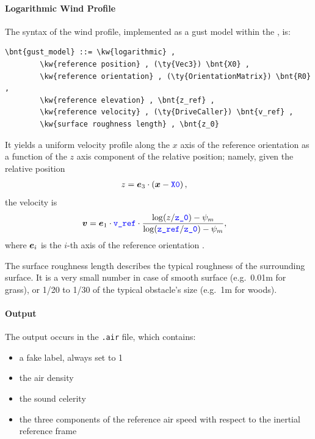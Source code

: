 \paragraph{Logarithmic Wind Profile}
The syntax of the  wind profile, implemented as a gust model
within the , is:
\begin{Verbatim}[commandchars=\\\{\}]
    \bnt{gust_model} ::= \kw{logarithmic} ,
        \kw{reference position} , (\ty{Vec3}) \bnt{X0} ,
        \kw{reference orientation} , (\ty{OrientationMatrix}) \bnt{R0} ,
        \kw{reference elevation} , \bnt{z_ref} ,
        \kw{reference velocity} , (\ty{DriveCaller}) \bnt{v_ref} ,
        \kw{surface roughness length} , \bnt{z_0}
\end{Verbatim}
It yields a uniform velocity profile along the $x$ axis of the
reference orientation as a function of the $z$ axis component
of the relative position; namely, given the relative position
\begin{align}
	z &= \boldsymbol{e}_3 \cdot \left( \boldsymbol{x} - \textcolor{blue}{\texttt{X0}} \right)
	,
\end{align}
the velocity is
\begin{align}
	\boldsymbol{v}
	&=
	\boldsymbol{e}_1 \cdot \textcolor{blue}{\texttt{v\_ref}} \cdot \frac{
		\log(z/\textcolor{blue}{\texttt{z\_0}}) - \psi_m
	}{
		\log(\textcolor{blue}{\texttt{z\_ref}}/\textcolor{blue}{\texttt{z\_0}}) - \psi_m
	}
	,
\end{align}
where $\boldsymbol{e}_i$ is the $i$-th axis of the reference orientation .

The surface roughness length describes the typical roughness
of the surrounding surface.
It is a very small number in case of smooth surface
(e.g.\ 0.01m for grass),
or 1/20 to 1/30 of the typical obstacle's size (e.g.\ 1m for woods).


\paragraph{Output}
The output occurs in the \texttt{.air} file, which contains:
\begin{itemize}
\item a fake label, always set to 1
\item the air density
\item the sound celerity
\item the three components of the reference air speed
with respect to the inertial reference frame
\end{itemize}


